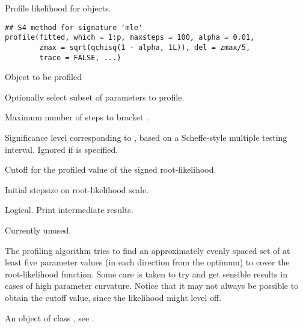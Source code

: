 %
\begin{Description}\relax
Profile likelihood for  objects.
\end{Description}
%
\begin{Usage}
\begin{verbatim}
## S4 method for signature 'mle'
profile(fitted, which = 1:p, maxsteps = 100, alpha = 0.01,
        zmax = sqrt(qchisq(1 - alpha, 1L)), del = zmax/5,
        trace = FALSE, ...)
\end{verbatim}
\end{Usage}
%
\begin{Arguments}
\begin{ldescription}
\item[\code{fitted}] Object to be profiled
\item[\code{which}] Optionally select subset of parameters to profile.
\item[\code{maxsteps}] Maximum number of steps to bracket .
\item[\code{alpha}] Significance level corresponding to , based on
a Scheffe-style multiple testing interval.  Ignored
if  is specified.
\item[\code{zmax}] Cutoff for the profiled value of the signed root-likelihood.
\item[\code{del}] Initial stepsize on root-likelihood scale.
\item[\code{trace}] Logical. Print intermediate results.
\item[\code{...}] Currently unused.
\end{ldescription}
\end{Arguments}
%
\begin{Details}\relax
The profiling algorithm tries to find an approximately evenly spaced
set of at least five parameter values (in each direction from the
optimum) to cover  
the root-likelihood function. Some care is taken to try and get sensible
results in cases of high parameter curvature. Notice that it may not
always be possible to obtain the cutoff value, since the likelihood
might level off.
\end{Details}
%
\begin{Value}
An object of class , see
.
\end{Value}
